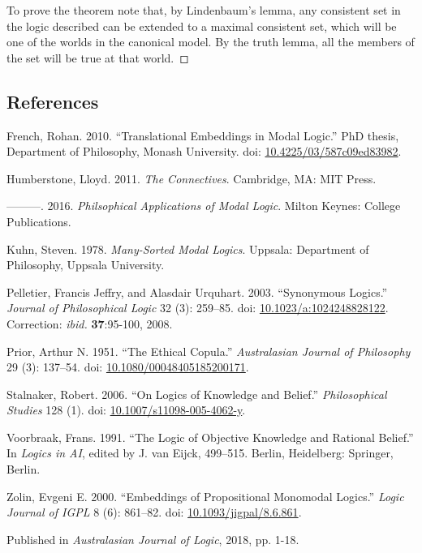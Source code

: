 \documentclass[
  10pt,
  letterpaper,
  DIV=11,
  numbers=noendperiod,
  twoside]{scrartcl}
\newlength{\cslhangindent}
\newenvironment{CSLReferences}[2] %
 {\begin{list}{}{%
  \setlength{\itemindent}{0pt}
  \setlength{\leftmargin}{0pt}
  \setlength{\parsep}{0pt}
  \ifodd #1
   \setlength{\leftmargin}{\cslhangindent}
   \setlength{\itemindent}{-1\cslhangindent}
  \fi
  \setlength{\itemsep}{#2\baselineskip}}}
 {\end{list}}
\begin{document}
To prove the theorem note that, by Lindenbaum's lemma, any consistent
set in the logic described can be extended to a maximal consistent set,
which will be one of the worlds in the canonical model. By the truth
lemma, all the members of the set will be true at that world.~◻

\subsection*{References}\label{references}

\label{refs}
\begin{CSLReferences}{1}{0}
French, Rohan. 2010. {``Translational Embeddings in Modal Logic.''} PhD
thesis, Department of Philosophy, Monash University. doi:
\href{https://doi.org/10.4225/03/587c09ed83982}{10.4225/03/587c09ed83982}.

Humberstone, Lloyd. 2011. \emph{The Connectives}. Cambridge, MA: MIT
Press.

---------. 2016. \emph{Philsophical Applications of Modal Logic}. Milton
Keynes: College Publications.

Kuhn, Steven. 1978. \emph{Many-Sorted Modal Logics}. Uppsala: Department
of Philosophy, Uppsala University.

Pelletier, Francis Jeffry, and Alasdair Urquhart. 2003. {``Synonymous
Logics.''} \emph{Journal of Philosophical Logic} 32 (3): 259--85. doi:
\href{https://doi.org/10.1023/a:1024248828122}{10.1023/a:1024248828122}.
Correction: \emph{ibid.} \textbf{37}:95-100, 2008.

Prior, Arthur N. 1951. {``The Ethical Copula.''} \emph{Australasian
Journal of Philosophy} 29 (3): 137--54. doi:
\href{https://doi.org/10.1080/00048405185200171}{10.1080/00048405185200171}.

Stalnaker, Robert. 2006. {``{On Logics of Knowledge and Belief}.''}
\emph{Philosophical Studies} 128 (1). doi:
\href{https://doi.org/10.1007/s11098-005-4062-y}{10.1007/s11098-005-4062-y}.

Voorbraak, Frans. 1991. {``The Logic of Objective Knowledge and Rational
Belief.''} In \emph{Logics in {AI}}, edited by J. van Eijck, 499--515.
Berlin, Heidelberg: Springer, Berlin.

Zolin, Evgeni E. 2000. {``Embeddings of Propositional Monomodal
Logics.''} \emph{Logic Journal of IGPL} 8 (6): 861--82. doi:
\href{https://doi.org/10.1093/jigpal/8.6.861}{10.1093/jigpal/8.6.861}.

\end{CSLReferences}



\noindent Published in\emph{
Australasian Journal of Logic}, 2018, pp. 1-18.
\end{document}
